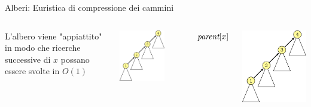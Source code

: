 \begin{frame}{Alberi: Euristica di compressione dei cammini}

\vspace{-12pt}
\begin{columns}[T]
L'albero viene "appiattito" in modo che 
ricerche successive di $x$ possano essere svolte in $O(1)$

\smallskip\centering
\includegraphics[width=0.7\textwidth,page=1]{mfset-compressione.pdf}
\begin{Procedure}
\caption[A]{\INTEGER\ \mffind($\INTEGER\ x$)}
  \Return $\textit{parent}[x]$\;
\end{Procedure}
\includegraphics[width=1\textwidth,page=2]{mfset-compressione.pdf}
\end{columns}
\end{frame}


